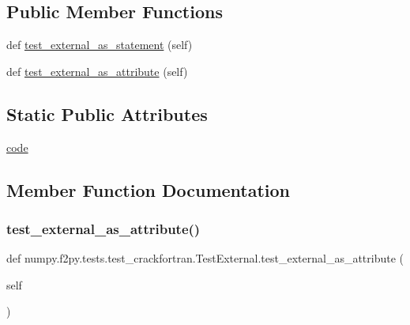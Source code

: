 \subsection*{Public Member Functions}
\begin{DoxyCompactItemize}
\item 
def \hyperlink{classnumpy_1_1f2py_1_1tests_1_1test__crackfortran_1_1TestExternal_af62b9b4670971ff284f8af22ed8c1b60}{test\+\_\+external\+\_\+as\+\_\+statement} (self)
\item 
def \hyperlink{classnumpy_1_1f2py_1_1tests_1_1test__crackfortran_1_1TestExternal_a123d6ffe4b4360c0f7c2912001ab41a2}{test\+\_\+external\+\_\+as\+\_\+attribute} (self)
\end{DoxyCompactItemize}
\subsection*{Static Public Attributes}
\begin{DoxyCompactItemize}
\item 
\hyperlink{classnumpy_1_1f2py_1_1tests_1_1test__crackfortran_1_1TestExternal_afddf0c0bbbe8c18448d32ca4a2022f14}{code}
\end{DoxyCompactItemize}


\subsection{Member Function Documentation}
\mbox{\label{classnumpy_1_1f2py_1_1tests_1_1test__crackfortran_1_1TestExternal_a123d6ffe4b4360c0f7c2912001ab41a2}} 
\subsubsection{\texorpdfstring{test\+\_\+external\+\_\+as\+\_\+attribute()}{test\_external\_as\_attribute()}}
{\footnotesize\ttfamily def numpy.\+f2py.\+tests.\+test\+\_\+crackfortran.\+Test\+External.\+test\+\_\+external\+\_\+as\+\_\+attribute (\begin{DoxyParamCaption}\item[{}]{self }\end{DoxyParamCaption})}

